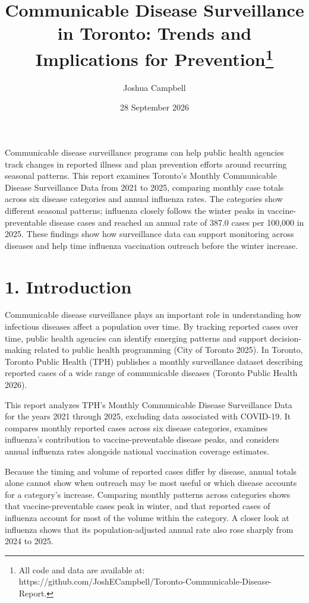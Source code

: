 \documentclass[
  letterpaper,
  DIV=11,
  numbers=noendperiod]{scrartcl}
\title{Communicable Disease Surveillance in Toronto: Trends and
Implications for Prevention\footnote{All code and data are available at:
  https://github.com/JoshECampbell/Toronto-Communicable-Disease-Report.}}
\author{Joshua Campbell}
\date{28 September 2026}
\begin{document}
\maketitle


Communicable disease surveillance programs can help public health
agencies track changes in reported illness and plan prevention efforts
around recurring seasonal patterns. This report examines Toronto's
Monthly Communicable Disease Surveillance Data from 2021 to 2025,
comparing monthly case totals across six disease categories and annual
influenza rates. The categories show different seasonal patterns;
influenza closely follows the winter peaks in vaccine-preventable
disease cases and reached an annual rate of 387.0 cases per 100,000 in
2025. These findings show how surveillance data can support monitoring
across diseases and help time influenza vaccination outreach before the
winter increase.

\section{1. Introduction}\label{introduction}

Communicable disease surveillance plays an important role in
understanding how infectious diseases affect a population over time. By
tracking reported cases over time, public health agencies can identify
emerging patterns and support decision-making related to public health
programming (City of Toronto 2025). In Toronto, Toronto Public Health
(TPH) publishes a monthly surveillance dataset describing reported cases
of a wide range of communicable diseases (Toronto Public Health 2026).

This report analyzes TPH's Monthly Communicable Disease Surveillance
Data for the years 2021 through 2025, excluding data associated with
COVID-19. It compares monthly reported cases across six disease
categories, examines influenza's contribution to vaccine-preventable
disease peaks, and considers annual influenza rates alongside national
vaccination coverage estimates.

Because the timing and volume of reported cases differ by disease,
annual totals alone cannot show when outreach may be most useful or
which disease accounts for a category's increase. Comparing monthly
patterns across categories shows that vaccine-preventable cases peak in
winter, and that reported cases of influenza account for most of the
volume within the category. A closer look at influenza shows that its
population-adjusted annual rate also rose sharply from 2024 to 2025.
\end{document}
